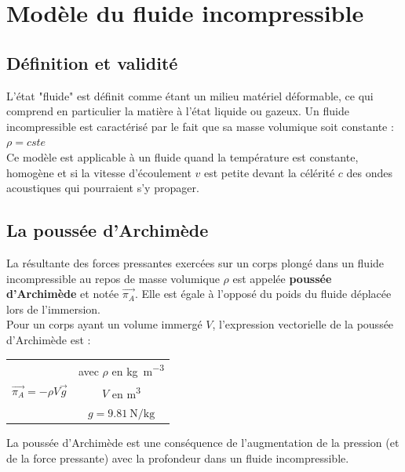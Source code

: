 \documentclass[a4paper,11pt,fleqn]{scrartcl}%
\begin{document}
	\maketitle

\section{Modèle du fluide incompressible}
    \subsection{Définition et validité}
    L'état "fluide" est définit comme étant un milieu matériel déformable, ce qui comprend en particulier la matière à l'état liquide ou gazeux. Un fluide incompressible est caractérisé par le fait que sa masse volumique soit constante : $\rho = cste$\\
    Ce modèle est applicable à un fluide quand la température est constante, homogène et si la vitesse d'écoulement $v$ est petite devant la célérité $c$ des ondes acoustiques qui pourraient s'y propager.
    
    \subsection{La poussée d'Archimède}
    La résultante  des forces pressantes exercées sur un corps plongé dans un fluide incompressible au repos de masse volumique $\rho$ est appelée \textbf{poussée d'Archimède} et notée $\overrightarrow{\pi_A}$. Elle est égale à l'opposé du poids du fluide déplacée lors de l'immersion.\\
    Pour un corps ayant un volume immergé $V$, l'expression vectorielle de la poussée d'Archimède est :
    \begin{center}
        \begin{tabular}{c|c}
        \multirow{3}{*}{$\overrightarrow{\pi_A}=-\rho V \overrightarrow{g}$} & avec $\rho$ en \unit{\kilo\gram\per\meter\cubed}\\
        &$V$ en \unit{\meter\cubed}\\
        &$g = \SI{9.81}{\newton\per\kilo\gram}$\\
    \end{tabular}
    \end{center}
    La poussée d'Archimède est une conséquence de l'augmentation de la pression (et de la force pressante) avec la profondeur dans un fluide incompressible.
    
\end{document}
